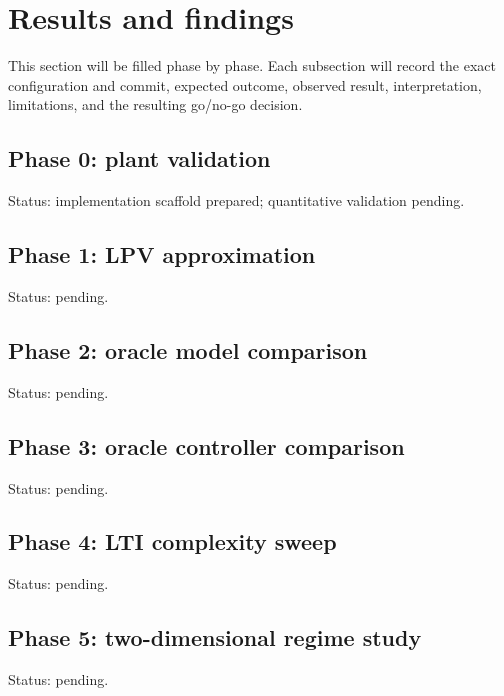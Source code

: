 \section{Results and findings}
This section will be filled phase by phase. Each subsection will record the exact
configuration and commit, expected outcome, observed result, interpretation,
limitations, and the resulting go/no-go decision.

\subsection{Phase 0: plant validation}
Status: implementation scaffold prepared; quantitative validation pending.

\subsection{Phase 1: LPV approximation}
Status: pending.

\subsection{Phase 2: oracle model comparison}
Status: pending.

\subsection{Phase 3: oracle controller comparison}
Status: pending.

\subsection{Phase 4: LTI complexity sweep}
Status: pending.

\subsection{Phase 5: two-dimensional regime study}
Status: pending.


